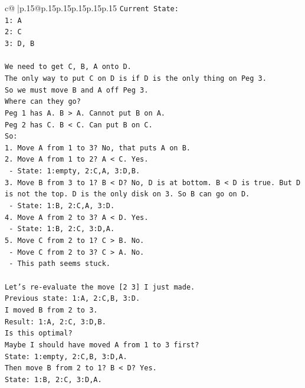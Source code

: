 \documentclass{article}
\begin{document}
{\begin{supertabular}{c@{$\;$}|p{.15\linewidth}@{}p{.15\linewidth}p{.15\linewidth}p{.15\linewidth}p{.15\linewidth}p{.15\linewidth}}
{{{\texttt{Current State:} \\
\texttt{1: A} \\
\texttt{2: C} \\
\texttt{3: D, B} \\
\\ 
\texttt{We need to get C, B, A onto D.} \\
\texttt{The only way to put C on D is if D is the only thing on Peg 3.} \\
\texttt{So we must move B and A off Peg 3.} \\
\texttt{Where can they go?} \\
\texttt{Peg 1 has A. B > A. Cannot put B on A.} \\
\texttt{Peg 2 has C. B < C. Can put B on C.} \\
\texttt{So:} \\
\texttt{1. Move A from 1 to 3? No, that puts A on B.} \\
\texttt{2. Move A from 1 to 2? A < C. Yes.} \\
\texttt{   {-} State: 1:empty, 2:C,A, 3:D,B.} \\
\texttt{3. Move B from 3 to 1? B < D? No, D is at bottom. B < D is true. But D is not the top. D is the only disk on 3. So B can go on D.} \\
\texttt{   {-} State: 1:B, 2:C,A, 3:D.} \\
\texttt{4. Move A from 2 to 3? A < D. Yes.} \\
\texttt{   {-} State: 1:B, 2:C, 3:D,A.} \\
\texttt{5. Move C from 2 to 1? C > B. No.} \\
\texttt{   {-} Move C from 2 to 3? C > A. No.} \\
\texttt{   {-} This path seems stuck.} \\
\\ 
\texttt{Let's re{-}evaluate the move {[}2 3{]} I just made.} \\
\texttt{Previous state: 1:A, 2:C,B, 3:D.} \\
\texttt{I moved B from 2 to 3.} \\
\texttt{Result: 1:A, 2:C, 3:D,B.} \\
\texttt{Is this optimal?} \\
\texttt{Maybe I should have moved A from 1 to 3 first?} \\
\texttt{State: 1:empty, 2:C,B, 3:D,A.} \\
\texttt{Then move B from 2 to 1? B < D? Yes.} \\
\texttt{State: 1:B, 2:C, 3:D,A.} \\
}}}
\end{supertabular}}
\end{document}
